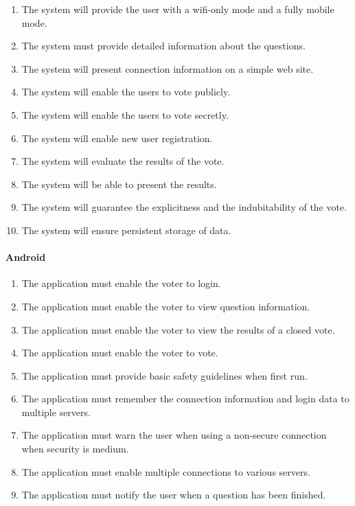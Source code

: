 \documentclass[11pt,twoside,a4paper]{book}
\begin{document}
\begin{enumerate}

\item  The system will provide the user with a wifi-only mode and a fully mobile mode.
\item  The system must provide detailed information about the questions.
\item  The system will present connection information on a simple web site.
\item  The system will enable the users to vote publicly. \cite{bakalarkaJV}
\item  The system will enable the users to vote secretly. \cite{bakalarkaJV}
\item  The system will enable new user registration. \cite{bakalarkaJV}
\item The system will evaluate the results of the vote.\cite{bakalarkaJV}
\item The system will be able to present the results.\cite{bakalarkaJV}
\item The system will guarantee the explicitness and the indubitability of the vote. \cite{bakalarkaJV}
\item The system will ensure persistent storage of data. \cite{bakalarkaJV}
\end{enumerate}
\paragraph*{Android}
\begin{enumerate}
\item The application must enable the voter to login. 
\item The application must enable the voter to view question information.
\item The application must enable the voter to view the results of a closed vote. 
\item The application must enable the voter to vote.
\item The application must provide basic safety guidelines when first run.
\item The application must remember the connection information and login data to multiple servers.
\item The application must warn the user when using a non-secure connection when security is medium.
\item The application must enable multiple connections to various servers.
\item The application must notify the user when a question has been finished.
\end{enumerate}
\end{document}
